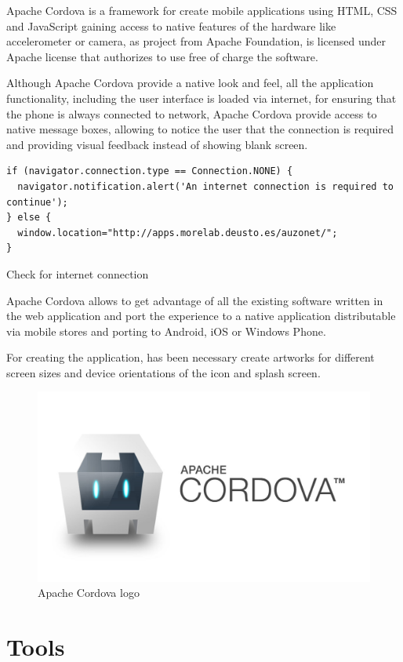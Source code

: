\documentclass{DeustoFDP}
\begin{document}
Apache Cordova is a framework for create mobile applications using HTML, CSS and JavaScript gaining access to native features of the hardware like accelerometer or camera, as project from Apache Foundation, is licensed under Apache license that authorizes to use free of charge the software.

Although Apache Cordova provide a native look and feel, all the application functionality, including the user interface is loaded via internet, for ensuring that the phone is always connected to network, Apache Cordova provide access to native message boxes, allowing to notice the user that the connection is required and providing visual feedback instead of showing blank screen.

\begin{listing}[!h]\centering 
	\begin{minipage}{.9\textwidth}
		\begin{verbatim}
if (navigator.connection.type == Connection.NONE) {
  navigator.notification.alert('An internet connection is required to continue');
} else {
  window.location="http://apps.morelab.deusto.es/auzonet/";
}
		\end{verbatim}
	\end{minipage}
	\caption{Check for internet connection}\label{lst:internetcheck}
\end{listing}

Apache Cordova \cite{Cordova} allows to get advantage of all the existing software written in the web application and port the experience to a native application distributable via mobile stores and porting to Android, iOS or Windows Phone.

For creating the application, has been necessary create artworks for different screen sizes and device orientations of the icon and splash screen.

\begin{figure}[h]
\centering
\includegraphics[width=0.4\linewidth]{fig/cordova}
\caption[Apache Cordova logo]{Apache Cordova logo}
\label{fig:cordova}
\end{figure}

\section{Tools}
\end{document}
